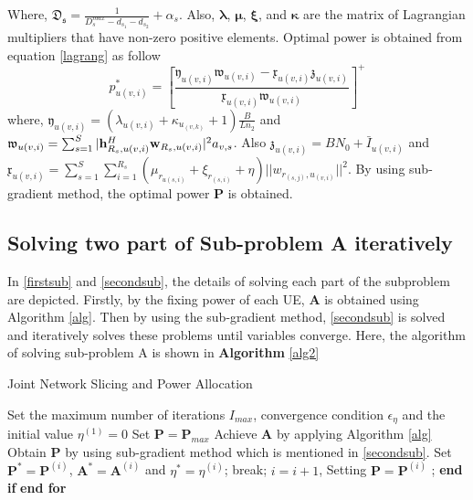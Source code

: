\documentclass[conference]{IEEEtran}
\begin{document}
Where, $\mathfrak{D_s}=\frac{1}{D_{s}^{max}-d_{s_1}-d_{s_2}}+\alpha_s$. Also, $\boldsymbol{\lambda}$, $\boldsymbol{\mu}$, $\boldsymbol{\xi}$, and $\boldsymbol{ \kappa}$ are the matrix of Lagrangian multipliers that have non-zero positive elements. Optimal power is obtained from equation \eqref{lagrang} as follow
\begin{equation}
p_{u(v,i)}^{*} = [\frac{\mathfrak{y}_{u(v,i)}\mathfrak{w}_{u(v,i)}-\mathfrak{x}_{u(v,i)}\mathfrak{z}_{u(v,i)}}{\mathfrak{x}_{u(v,i)}\mathfrak{w}_{u(v,i)} }]^+
\end{equation}
where, $\mathfrak{y}_{u(v,i)}= (\lambda_{u(v,i)}+\kappa_{u_{(v,k)}}+1)\frac{B}{Ln_2}$ and 
$\mathfrak{w}_{u(v,i)} = \sum_{s=1}^{S}|\bold{h}_{R_s,u(v,i)}^H \bold{w}_{R_s,u(v,i)}|^2 a_{v,s}$. Also 
$\mathfrak{z}_{u(v,i)} = BN_0 + \bar{I}_{u(v,i)}$ and $\mathfrak{x}_{u(v,i)} = \sum\limits_{s=1}^{S} \sum\limits_{i=1}^{R_s} ( \mu_{r_{u(s,i)}} + \xi_{r_{(s,i)}}+\eta)||w_{r_{(s,j)},u_{(v,i)}}||^2$. 
By using sub-gradient method, the optimal power $\boldsymbol{P}$ is obtained. 
\subsection{Solving two part of Sub-problem A iteratively}
In \eqref{firstsub} and \eqref{secondsub}, the details of solving each part of the subproblem are depicted. 
Firstly, by the fixing power of each UE, $\boldsymbol{A}$ is obtained using Algorithm \eqref{alg}. Then by using the sub-gradient method, \eqref{secondsub} is solved and iteratively solves these problems until variables converge.
Here, the algorithm of solving sub-problem A is shown in \textbf{Algorithm} \eqref{alg2}
\begin{algorithm}
\caption{Joint Network Slicing and Power Allocation}\label{alg2}
\begin{algorithmic}[1]
\State Set the maximum number of iterations $I_{max}$, convergence condition $\epsilon_{\eta}$  and the initial value $\eta^{(1)} = 0$
\State Set $\boldsymbol{P} = \boldsymbol{P}_{max}$
\State Achieve $\boldsymbol{A}$ by applying Algorithm \eqref{alg}
\State Obtain $\boldsymbol{P}$ by using sub-gradient method which is mentioned in \eqref{secondsub}.
\State Set $\boldsymbol{P}^*= \boldsymbol{P}^{(i)} $, $\boldsymbol{A}^*= \boldsymbol{A}^{(i)} $   and  $ \eta^{*} =\eta^{(i)} $;
\State break;
\Else
\State $i= i+1$, Setting $\boldsymbol{P} = \boldsymbol{P}^{(i)}$ ;
\EndIf 
\State \textbf{end if}
\EndFor 
\State \textbf{end for}
\end{algorithmic}
\end{algorithm}
\end{document}
